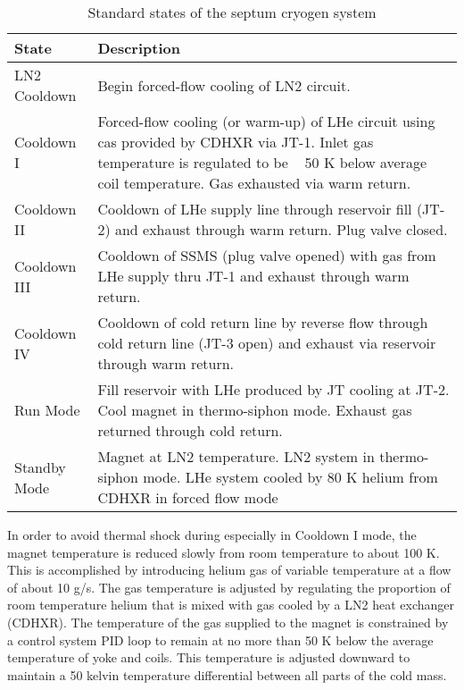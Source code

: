 {\begin{table}[htp]
\begin{tabular}{|p{}|p{}|}
\hline
State        & Description \\ \hline
LN2 Cooldown & Begin forced-flow cooling of LN2 circuit.\\  \hline
Cooldown I   & Forced-flow cooling (or warm-up) of LHe circuit using 
               cas provided by CDHXR via JT-1. Inlet gas temperature 
               is regulated to be ~ 50 K below average coil temperature.
               Gas exhausted via warm return.\\  \hline
Cooldown II  & Cooldown of LHe supply line through reservoir fill (JT-2) 
               and exhaust through warm return. Plug valve closed.\\ \hline
Cooldown III & Cooldown of SSMS (plug valve opened) with gas from LHe supply 
               thru JT-1 and exhaust through warm return.\\ \hline
Cooldown IV  & Cooldown of cold return line by reverse flow through cold 
               return line (JT-3 open) and exhaust via reservoir through 
               warm return.\\ \hline
Run Mode     & Fill reservoir with LHe produced by JT cooling at JT-2.  
               Cool magnet in thermo-siphon mode.  Exhaust gas returned 
               through cold return.\\ \hline
Standby Mode & Magnet at LN2 temperature.  LN2 system in thermo-siphon mode. 
               LHe system cooled by 80 K helium from CDHXR in forced flow mode \\
\hline
\end{tabular}
\caption[Spectrometers: Septum cryo states]{Standard states of the septum cryogen system }
\label{tab:septumcryo}
\end{table}

In order to avoid thermal shock during especially in Cooldown I mode, the magnet temperature is reduced 
slowly from room temperature to about 100 K.  This is accomplished by introducing helium gas of variable 
temperature at a flow of about 10 g/s.  The gas temperature is adjusted by regulating the proportion of 
room temperature helium that is mixed with gas cooled by a LN2 heat exchanger (CDHXR).  The temperature 
of the gas supplied to the magnet is constrained by a control system PID loop to remain at no more than 
50 K below the average temperature of yoke and coils. This temperature is adjusted downward to maintain 
a 50 kelvin temperature differential between all parts of the cold mass.
} %


